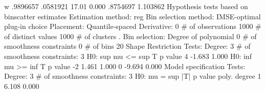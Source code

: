            w {\VBAR}   .9896657   .0581921    17.01   0.000     .8754697    1.103862
{\smallskip}
Hypothesis tests based on binscatter estimates
Estimation method: reg
Bin selection method: IMSE-optimal plug-in choice
Placement: Quantile-spaced
Derivative: 0
{\smallskip}
\# of observations             {\VBAR}    1000
\# of distinct values          {\VBAR}    1000
\# of clusters                 {\VBAR}       .
Bin selection:                {\VBAR} 
         Degree of polynomial {\VBAR}       0
  \# of smoothness constraints {\VBAR}       0
                    \# of bins {\VBAR}      20
{\smallskip}
Shape Restriction Tests:
Degree: 3     \# of smoothness constraints: 3
{\smallskip}
H0: sup mu <=      {\VBAR} sup T             p value
         4         {\VBAR}  -1.683             1.000
{\smallskip}
H0: inf mu >=      {\VBAR} inf T             p value
         -2        {\VBAR}   1.461             1.000
         0         {\VBAR}  -9.694             0.000
{\smallskip}
Model specification Tests:
Degree: 3     \# of smoothness constraints: 3
{\smallskip}
H0: mu =           {\VBAR} sup |T|           p value
poly. degree  1    {\VBAR}   6.108             0.000

